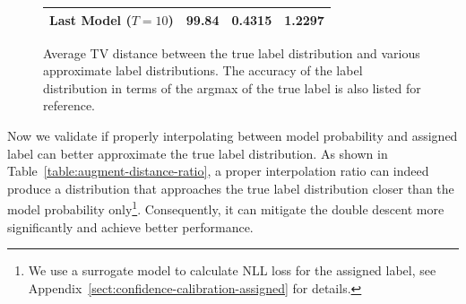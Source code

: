 \begin{figure}[!ht]
\begin{floatrow}
{\begin{tabular}{rlll}
    \makecell{Last Model \\ ($T=10$)} & 99.84 & 0.4315 & 1.2297 \\
    \bottomrule
  \end{tabular}
}{%
  \vspace{8ex}
  \caption{Average TV distance between the true label distribution and various approximate label distributions. The accuracy of the label distribution in terms of the argmax of the true label is also listed for reference.
  }
  \label{table:augment-distance-temperature}
}
\end{floatrow}
\end{figure}









Now we validate if properly interpolating between model probability and assigned label can better approximate the true label distribution. As shown in Table~\ref{table:augment-distance-ratio}, a proper interpolation ratio can indeed produce a distribution that approaches the true label distribution closer than the model probability only\footnote{We use a surrogate model to calculate NLL loss for the assigned label, see Appendix~\ref{sect:confidence-calibration-assigned} for details.}. Consequently, it can mitigate the double descent more significantly and achieve better performance.




